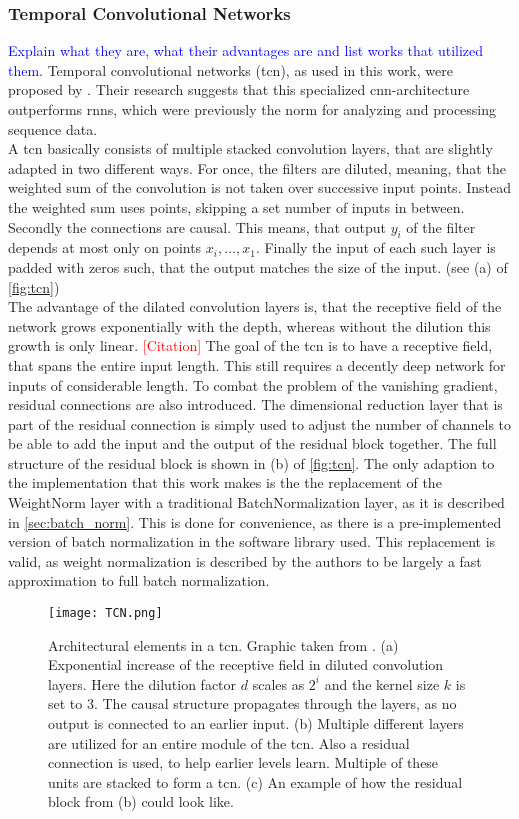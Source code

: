 \subsubsection{Temporal Convolutional Networks}
\textcolor{blue}{Explain what they are, what their advantages are and list works that utilized them.}
Temporal convolutional networks (\gls{tcn}), as used in this work, were proposed by \cite{tcn_paper}. Their research suggests that this specialized \gls{cnn}-architecture outperforms \gls{rnns}, which were previously the norm for analyzing and processing sequence data.\\
A \gls{tcn} basically consists of multiple stacked convolution layers, that are slightly adapted in two different ways. For once, the filters are diluted, meaning, that the weighted sum of the convolution is not taken over successive input points. Instead the weighted sum uses points, skipping a set number of inputs in between. Secondly the connections are causal. This means, that output $y_i$ of the filter depends at most only on points $x_i, \dotsc,x_1$. Finally the input of each such layer is padded with zeros such, that the output matches the size of the input. (see (a) of \autoref{fig:tcn})\\
The advantage of the dilated convolution layers is, that the receptive field of the network grows exponentially with the depth, whereas without the dilution this growth is only linear. \textcolor{red}{[Citation]} The goal of the \gls{tcn} is to have a receptive field, that spans the entire input length. This still requires a decently deep network for inputs of considerable length. To combat the problem of the vanishing gradient, residual connections are also introduced. The dimensional reduction layer that is part of the residual connection is simply used to adjust the number of channels to be able to add the input and the output of the residual block together. The full structure of the residual block is shown in (b) of \autoref{fig:tcn}. The only adaption to the implementation that this work makes is the the replacement of the WeightNorm layer with a traditional BatchNormalization layer, as it is described in \autoref{sec:batch_norm}. This is done for convenience, as there is a pre-implemented version of batch normalization in the software library used. This replacement is valid, as weight normalization is described by the authors to be largely a fast approximation to full batch normalization. \cite{weigth_norm_invention}
\begin{figure}
\centering
\texttt{[image: TCN.png]}
\caption[TCN structure]{Architectural elements in a \gls{tcn}. Graphic taken from \cite{tcn_paper}. (a) Exponential increase of the receptive field in diluted convolution layers. Here the dilution factor $d$ scales as $2^i$ and the kernel size $k$ is set to $3$. The causal structure propagates through the layers, as no output is connected to an earlier input. (b) Multiple different layers are utilized for an entire module of the \gls{tcn}. Also a residual connection is used, to help earlier levels learn. Multiple of these units are stacked to form a \gls{tcn}. (c) An example of how the residual block from (b) could look like.}\label{fig:tcn}
\end{figure}


